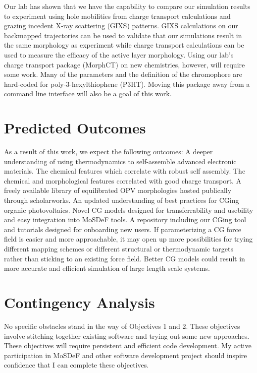 Our lab has shown that we have the capability to compare our simulation results to experiment using hole mobilities from charge transport calculations\cite{Jones2017,Miller2018a} and grazing incedent X-ray scattering (GIXS) patterns\cite{Miller2018}.
GIXS calculations on our backmapped trajectories can be used to validate that our simulations result in the same morphology as experiment while charge transport calculations can be used to measure the efficacy of the active layer morphology.
Using our lab's charge transport package (MorphCT) on new chemistries, however, will require some work.
Many of the parameters and the definition of the chromophore are hard-coded for poly-3-hexylthiophene (P3HT).
Moving this package away from a command line interface will also be a goal of this work.


\section*{Predicted Outcomes}

As a result of this work, we expect the following outcomes:
A deeper understanding of using thermodynamics to self-assemble advanced electronic materials. 
The chemical features which correlate with robust self assembly. 
The chemical and morphological features correlated with good charge transport. 
A freely available library of equilibrated OPV morphologies hosted publically through scholarworks.
An updated understanding of best practices for CGing organic photovoltaics.
Novel CG models designed for transferrability and usebility and easy integration into MoSDeF tools.
A repository including our CGing tool and tutorials designed for onboarding new users.
If parameterizing a CG force field is easier and more approachable, it may open up more possibilities for trying different mapping schemes or different structural or thermodynamic targets rather than sticking to an existing force field.
Better CG models could result in more accurate and efficient simulation of large length scale systems.

\section*{Contingency Analysis}

No specific obstacles stand in the way of Objectives 1 and 2. 
These objectives involve stitching together existing software and trying out some new approaches.
These objectives will require persistent and efficient code development.
My active participation in MoSDeF and other software development project should inspire confidence that I can complete these objectives.

